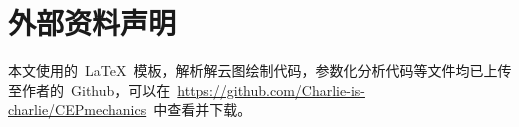\chapter{外部资料声明}
\label{cha:statement}
本文使用的~\LaTeX{}~模板，解析解云图绘制代码，参数化分析代码等文件均已上传至作者的~Github，可以在~\url{https://github.com/Charlie-is-charlie/CEPmechanics}~中查看并下载。
